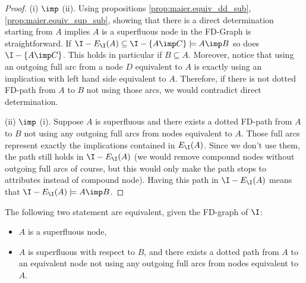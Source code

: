 \begin{proof} (i) $\imp$ (ii). Using propositions \ref{prop:maier.equiv_dd_sub},
\ref{prop:maier.equiv_sup_sub}, showing that there is a direct determination 
starting from $A$ implies $A$ is a superfluous node in the FD-Graph is 
straightforward. If $\I - E_{\I}(A) \subseteq \I - \{A \imp C \} \models A \imp 
B$ so does $\I - \{A \imp C \}$. This holds in particular if $B \subseteq A$. 
Moreover, notice that using an outgoing full arc from a node $D$ equivalent to 
$A$ is exactly using an implication with left hand side equivalent to $A$. 
Therefore, if there is not dotted FD-path from $A$ to $B$ not using those arcs, 
we would contradict direct determination.

\vspace{1.2em}

(ii) $\imp$ (i). Suppose $A$ is superfluous and there 
exists a dotted FD-path from $A$ to $B$ not using any outgoing full arcs 
from nodes equivalent to $A$. Those full arcs represent exactly the 
implications contained in $E_{\I}(A)$. Since we don't use them, the path still 
holds in $\I - E_{\I}(A)$ (we would remove compound nodes without outgoing full 
arcs of course, but this would only make the path stops to attributes instead 
of compound node). Having this path in $\I - E_{\I}(A)$ means that $\I - 
E_{\I}(A) \models A \imp B$.
	
\end{proof}

\begin{proposition} \label{prop:maier.equiv_sup_ssup}
	The following two statement are equivalent, given the FD-graph of $\I$:
	\begin{itemize}
		\item[(i)] $A$ is a superfluous node,
		\item[(ii)] $A$ is superfluous with respect to $B$, and there exists a
		dotted path from $A$ to an equivalent node not using any outgoing full 
		arcs from nodes	equivalent to $A$.
	\end{itemize}
	
\end{proposition}

